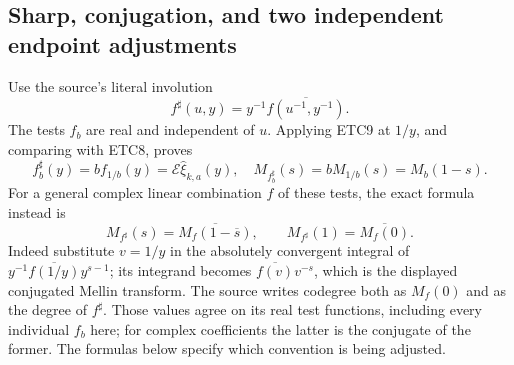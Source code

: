 \documentclass[11pt]{article}
\begin{document}
\subsection{Sharp, conjugation, and two independent endpoint adjustments}

Use the source's literal involution
\begin{equation}\tag{ETC17}
 f^\sharp(u,y)=y^{-1}\overline{f(u^{-1},y^{-1})}.
\end{equation}
The tests $f_b$ are real and independent of $u$. Applying ETC9 at
$1/y$, and comparing with ETC8, proves
\begin{equation}\tag{ETC18}
 f_b^\sharp(y)=b f_{1/b}(y)
     =\mathcal E\widehat\xi_{k,a}(y),\quad
 M_{f_b^\sharp}(s)=bM_{1/b}(s)=M_b(1-s).
\end{equation}
For a general complex linear combination $f$ of these tests,
the exact formula instead is
\begin{equation}\tag{ETC19}
 M_{f^\sharp}(s)=\overline{M_f(1-\overline s)},\qquad
 M_{f^\sharp}(1)=\overline{M_f(0)}.
\end{equation}
Indeed substitute $v=1/y$ in the absolutely convergent integral
of $y^{-1}\overline{f(1/y)}y^{s-1}$; its integrand becomes
$\overline{f(v)}v^{-s}$, which is the displayed conjugated
Mellin transform. The source writes codegree both as $M_f(0)$
and as the degree of $f^\sharp$. Those values agree on its real
test functions, including every individual $f_b$ here; for complex
coefficients the latter is the conjugate of the former. The formulas
below specify which convention is being adjusted.
\end{document}
